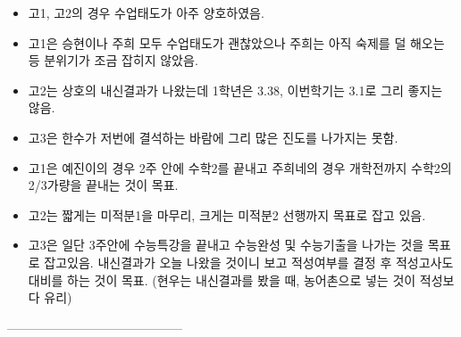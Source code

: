 \documentclass[idxtotoc,hyperref,openany]{labbook} %
\begin{document}
\begin{itemize}
	\item 고1, 고2의 경우 수업태도가 아주 양호하였음.
	\item 고1은 승현이나 주희 모두 수업태도가 괜찮았으나 주희는 아직 숙제를 덜 해오는 등 분위기가 조금 잡히지 않았음.
	\item 고2는 상호의 내신결과가 나왔는데 1학년은 3.38, 이번학기는 3.1로 그리 좋지는 않음.
	\item 고3은 한수가 저번에 결석하는 바람에 그리 많은 진도를 나가지는 못함.
\end{itemize}

\begin{itemize}
 \item 고1은 예진이의 경우 2주 안에 수학2를 끝내고 주희네의 경우 개학전까지 수학2의 2/3가량을 끝내는 것이 목표.
 \item 고2는 짧게는 미적분1을 마무리, 크게는 미적분2 선행까지 목표로 잡고 있음.
 \item 고3은 일단 3주안에 수능특강을 끝내고 수능완성 및 수능기출을 나가는 것을 목표로 잡고있음.
 내신결과가 오늘 나왔을 것이니 보고 적성여부를 결정 후 적성고사도 대비를 하는 것이 목표. (현우는 내신결과를 봤을 때, 농어촌으로 넣는 것이 적성보다 유리)
\end{itemize}





------------------------------------------










\end{document}
